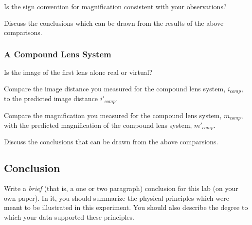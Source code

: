 \noindent
Is the sign convention for magnification consistent with your observations?
\vspace*{.3cm}

\noindent 
Discuss the conclusions which can be drawn from the results of the above 
comparisons.
\newpage 

\subsubsection{A Compound Lens System}  

Is the image of the first lens alone real or virtual?
\vspace*{.3cm}

\noindent
Compare the image distance you measured for the compound lens system,
$i_{comp},$ to the predicted image distance $i'_{comp}.$
\vspace*{1.4cm}

\noindent
Compare the magnification you measured for the compound lens system,
$m_{comp},$ with the predicted magnification of the compound lens system,
$m'_{comp}.$
\vspace*{1.4cm}

\noindent
Discuss the conclusions that can be drawn from the above comparsions.
\vspace*{3cm}

\subsection{Conclusion}

Write a {\it brief} (that is, a one or two paragraph) conclusion for this lab (on your
own paper). In it, you should summarize the physical principles which were meant to be
illustrated in this experiment. You should also describe the degree to which your data
supported these principles.





\renewcommand{\thesection}{\thechapter.\arabic{section}}


